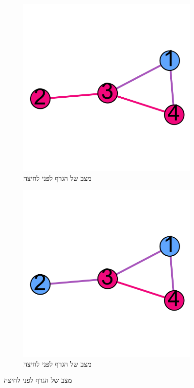 \documentclass[12pt,leqno]{article}
\begin{document}
\begin{figure}[ht]
    \caption{
        דוגמה לתיאור וקטור שינוי במהלך משחק על גרף
        }
    \label{fig: change vector on graph}
    \centering
    \begin{subfigure}[b]{.4\linewidth}
        \caption{מצב של הגרף לפני לחיצה}
        \label{fig:start graph presses}
        \centering
        \includegraphics[width=.7\textwidth,keepaspectratio]{images/graph_presses.png}
    \end{subfigure}
    \begin{subfigure}[b]{.4\linewidth}
        \caption{מצב של הגרף לפני לחיצה}
        \label{fig:start graph presses solution}
        \centering
        \includegraphics[width=.7\textwidth,keepaspectratio]{images/graph_presses_solve.png}
    \end{subfigure}
\end{figure}
\end{document}
